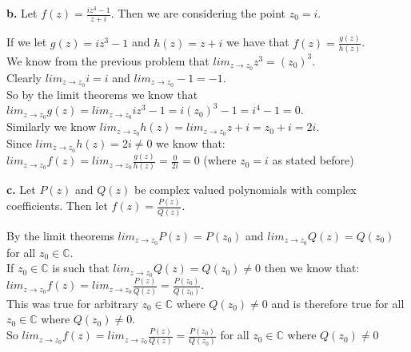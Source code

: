 \documentclass{article}
\begin{document}
{\Large\textbf{b.}} Let $f(z) =\frac{i z^3 - 1}{z + i}$. Then we are considering the point $z_0 = i$.
\begin{center}
    \doublespacing
    If we let $g(z) = i z^3 - 1$ and $h(z) = z + i$ we have that $f(z) =\frac{g(z)}{h(z)}$.
    \\We know from the previous problem that $lim _{z\rightarrow z_0} z^3 = (z_0)^3$.
    \\Clearly $lim _{z\rightarrow z_0} i = i$ and $lim _{z\rightarrow z_0} -1 = -1$.
    \\So by the limit theorems we know that $lim _{z\rightarrow z_0} g(z) = lim _{z\rightarrow z_0} i z^3 - 1 = i(z_0)^3 - 1 = i^4 - 1 = 0$.
    \\Similarly we know $lim _{z\rightarrow z_0} h(z) = lim _{z\rightarrow z_0} z + i = z_0 + i = 2i$.
    \\Since $lim _{z\rightarrow z_0} h(z) = 2i\neq 0$ we know that:
    \\$lim _{z\rightarrow z_0} f(z) = lim _{z\rightarrow z_0}\frac{g(z)}{h(z)} =\frac{0}{2i} = 0$ (where $z_0 = i$ as stated before) \qedsymbol
\end{center}

{\Large\textbf{c.}} Let $P(z)$ and $Q(z)$ be complex valued polynomials with complex coefficients. Then let $f(z) =\frac{P(z)}{Q(z)}$.
\begin{center}
    \doublespacing
    By the limit theorems $lim _{z\rightarrow z_0} P(z) = P(z_0)$ and $lim _{z\rightarrow z_0} Q(z) = Q(z_0)$ for all $z_0\in\mathbb{C}$.
    \\If $z_0\in\mathbb{C}$ is such that $lim _{z\rightarrow z_0} Q(z) = Q(z_0)\neq 0$ then we know that:
    \\$lim _{z\rightarrow z_0} f(z) = lim _{z\rightarrow z_0}\frac{P(z)}{Q(z)} =\frac{P(z_0)}{Q(z_0)}$.
    \\This was true for arbitrary $z_0\in\mathbb{C}$ where $Q(z_0)\neq 0$ and is therefore true for all $z_0\in\mathbb{C}$ where $Q(z_0)\neq 0$.
    \\So $lim _{z\rightarrow z_0} f(z) = lim _{z\rightarrow z_0}\frac{P(z)}{Q(z)} =\frac{P(z_0)}{Q(z_0)}$ for all $z_0\in\mathbb{C}$ where $Q(z_0)\neq 0$ \qedsymbol
\end{center}


\newpage
\end{document}
